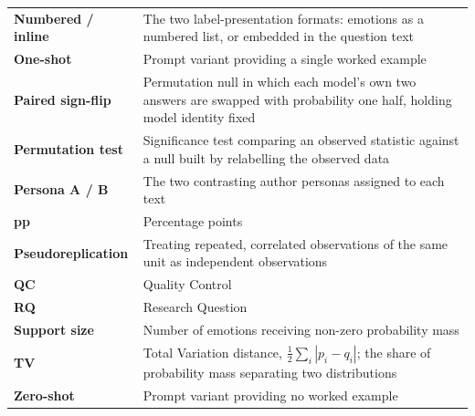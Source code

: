\begin{longtable}{@{}p{.20\hsize} p{.75\hsize}@{}}
\textbf{Numbered / inline} & The two label-presentation formats: emotions as a numbered list, or embedded in the question text \\[6pt]
\textbf{One-shot} & Prompt variant providing a single worked example \\[6pt]
\textbf{Paired sign-flip} & Permutation null in which each model's own two answers are swapped with probability one half, holding model identity fixed \\[6pt]
\textbf{Permutation test} & Significance test comparing an observed statistic against a null built by relabelling the observed data \\[6pt]
\textbf{Persona A / B} & The two contrasting author personas assigned to each text \\[6pt]
\textbf{pp} & Percentage points \\[6pt]
\textbf{Pseudo\-repli\-cation} & Treating repeated, correlated observations of the same unit as independent observations \\[6pt]
\textbf{QC} & Quality Control \\[6pt]
\textbf{RQ} & Research Question \\[6pt]
\textbf{Support size} & Number of emotions receiving non-zero probability mass \\[6pt]
\textbf{TV} & Total Variation distance, $\tfrac{1}{2}\sum_i |p_i - q_i|$; the share of probability mass separating two distributions \\[6pt]
\textbf{Zero-shot} & Prompt variant providing no worked example \\[6pt]
\end{longtable}
